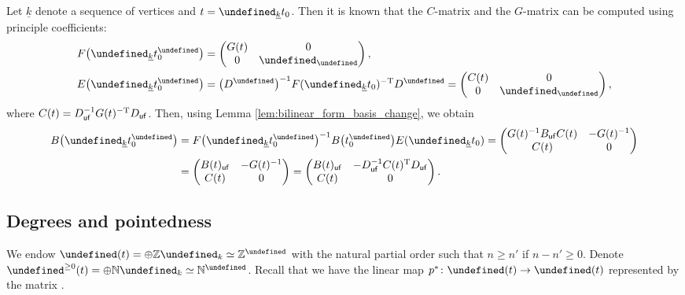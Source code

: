 \documentclass[10pt,a4paper]{amsart}
\newcommand{\Z}{\mathbb{Z}}
\newcommand{\N}{\mathbb{N}}
\newcommand{\opname}[1]{\operatorname{\mathsf{#1}}}
\newcommand{\uk}{{\underline{k}}}
\newcommand{\tB}{{\widetilde{B}}}
\newcommand{\fv}{\opname{f}}
\newcommand{\ufv}{\opname{uf}}
\let\Mc\undefined
\let\Nufv\undefined
\let\Iufv\undefined
\let\Id\undefined
\let\prin\undefined
\let\seq\undefined
\let\ee\undefined
\let\low\undefined
\newcommand{\Mc}{M^\circ}
\newcommand{\Nufv}{N_{\opname{uf}}}
\newcommand{\Iufv}{I_{\ufv}}
\newcommand{\Id}{{\opname{Id}}}
\newcommand{\prin}{{\opname{prin}}}
\newcommand{\seq}{\boldsymbol{\mu}}%
\newcommand{\ee}{\mathbf{e}}
\newcommand{\low}{\opname{\fv,\ufv}}
\numberwithin{equation}{section}
\begin{document}
Let $\uk$ denote a sequence of vertices and $t=\seq_{\uk}t_{0}$.
Then it is known that the $C$-matrix and the $G$-matrix can be computed
using principle coefficients:
\begin{align*}
F\big(\seq_{\uk}t_{0}^{\prin}\big) & =\left(\begin{matrix}
G(t) & 0\\
0 & \Id_{\Iufv}
\end{matrix}\right),\\
E\big(\seq_{\uk}t_{0}^{\prin}\big) & =\big(D^{\prin}\big)^{-1}F(\seq_{\uk}t_{0})^{\rm -T}D^{\prin}=\left(\begin{matrix}
C(t) & 0\\
0 & \Id_{\Iufv}
\end{matrix}\right),
\end{align*}
where $C(t)=D_{\ufv}^{-1}G(t)^{\rm -T}D_{\ufv}$. Then, using Lemma \ref{lem:bilinear_form_basis_change},
we obtain
\begin{align*}
B\big(\seq_{\uk}t_{0}^{\prin}\big) & =F\big(\seq_{\uk}t_{0}^{\prin}\big)^{-1}B\big(t_{0}^{\prin}\big)E(\seq_{\uk}t_{0}) =\left(\begin{matrix}
G(t)^{-1}B_{\ufv}C(t) & -G(t)^{-1}\\
C(t) & 0
\end{matrix}\right)\\
 & =\left(\begin{matrix}
B(t)_{\ufv} & -G(t)^{-1}\\
C(t) & 0
\end{matrix}\right)=\left(\begin{matrix}
B(t)_{\ufv} & -D_{\ufv}^{-1}C(t)^{\rm T}D_{\ufv}\\
C(t) & 0
\end{matrix}\right).
\end{align*}


\subsection{Degrees and pointedness}\label{sec:pointedness}

We endow $\Nufv(t)=\oplus\Z \ee_{k}\simeq\Z^{\Iufv}$ with the natural
partial order such that $n\geq n'$ if $n-n'\geq0$. Denote $\Nufv^{\geq0}(t)=\oplus\N \ee_{k}\simeq\N^{\Iufv}$.
Recall that we have the linear map $p^{*}\colon\Nufv(t)\rightarrow\Mc(t)$
represented by the matrix \smash{$\tB=\left(\begin{smallmatrix}
B_{\ufv}\\
B_{\low}
\end{smallmatrix}\right)$}.
\end{document}
